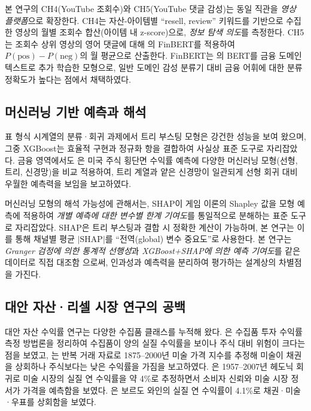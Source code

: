 \documentclass[11pt, a4paper, twocolumn]{article}
\begin{document}
본 연구의 CH4(YouTube 조회수)와 CH5(YouTube 댓글 감성)는 동일 직관을
\emph{영상 플랫폼}으로 확장한다. CH4는 자산-아이템별 ``resell,
review'' 키워드를 기반으로 수집한 영상의 월별 조회수 합산(아이템 내
z-score)으로, \emph{정보 탐색 의도}를 측정한다. CH5는 조회수 상위
영상의 영어 댓글에 대해 \citet{araci2019finbert}의 FinBERT를 적용하여
$P(\text{pos})-P(\text{neg})$의 월 평균으로 산출한다. FinBERT는
\citet{devlinetal2019}의 BERT를 금융 도메인 텍스트로 추가 학습한
모형으로, 일반 도메인 감성 분류기 대비 금융 어휘에 대한 분류 정확도가
높다는 점에서 채택하였다.

\subsection{머신러닝 기반 예측과 해석}
표 형식 시계열의 분류·회귀 과제에서 트리 부스팅 모형은 강건한
성능을 보여 왔으며, 그중 XGBoost\citep{chenguestrin2016}는 효율적
구현과 정규화 항을 결합하여 사실상 표준 도구로 자리잡았다. 금융
영역에서도 \citet{gukellyxiu2020}은 미국 주식 횡단면 수익률 예측에
다양한 머신러닝 모형(선형, 트리, 신경망)을 비교 적용하여, 트리
계열과 얕은 신경망이 일관되게 선형 회귀 대비 우월한 예측력을
보임을 보고하였다.

머신러닝 모형의 해석 가능성에 관해서는, SHAP\citep{lundberglee2017}이
게임 이론의 Shapley 값을 모형 예측에 적용하여 \emph{개별 예측에
대한 변수별 한계 기여도}를 통일적으로 분해하는 표준 도구로 자리잡았다.
SHAP은 트리 부스팅과 결합 시 정확한 계산이 가능하며, 본 연구는
이를 통해 채널별 평균 $|\text{SHAP}|$를 ``전역(global) 변수 중요도''로
사용한다. 본 연구는 \emph{Granger 검정에 의한 통계적 선행성}과
\emph{XGBoost+SHAP에 의한 예측 기여도}를 같은 데이터로 직접 대조함
으로써, 인과성과 예측력을 분리하여 평가하는 설계상의 차별점을
가진다.

\subsection{대안 자산·리셀 시장 연구의 공백}
대안 자산 수익률 연구는 다양한 수집품 클래스를 누적해 왔다.
\citet{burtonjacobsen1999}은 수집품 투자 수익률 측정 방법론을 정리하여
수집품이 양의 실질 수익률을 보이나 주식 대비 위험이 크다는 점을
보였고, \citet{meimoses2002}는 반복 거래 자료로 1875--2000년 미술
가격 지수를 추정해 미술이 채권을 상회하나 주식보다는 낮은 수익률을
가짐을 보고하였다. \citet{renneboogspaenjers2013}은 1957--2007년
헤도닉 회귀로 미술 시장의 실질 연 수익률을 약 4\%로 추정하면서
소비자 신뢰와 미술 시장 정서가 가격을 예측함을 보였다.
\citet{dimsonrousseauspaenjers2015}은 보르도 와인의 실질 연 수익률이
4.1\%로 채권·미술·우표를 상회함을 보였다.
\end{document}
